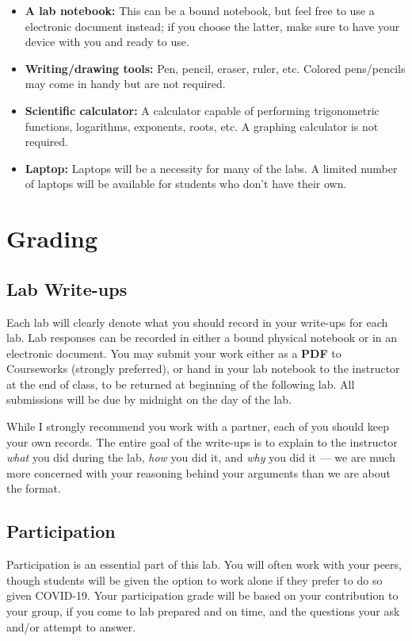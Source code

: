 \documentclass[11pt]{article}
\begin{document}
\begin{itemize}
\item \textbf{A lab notebook:} This can be a bound notebook, but feel free to use a electronic document instead; if you choose the latter, make sure to have your device with you and ready to use.  
\item \textbf{Writing/drawing tools:} Pen, pencil, eraser, ruler, etc. Colored pens/pencils may come in handy but are not required.
\item \textbf{Scientific calculator:}  A calculator capable of performing trigonometric functions, logarithms, exponents, roots, etc. A graphing calculator is not required. 
\item \textbf{Laptop:} Laptops will be a necessity for many of the labs.  A limited number of laptops will be available for students who don't have their own. \\
\end{itemize}

\section*{Grading}

\subsection*{Lab Write-ups}
Each lab will clearly denote what you should record in your write-ups for each lab. Lab responses can be recorded in either a bound physical notebook or in an electronic document. You may submit your work either as a \textbf{PDF} to Courseworks (strongly preferred), or hand in your lab notebook to the instructor at the end of class, to be returned at beginning of the following lab.  All submissions will be due by midnight on the day of the lab.

\noindent While I strongly recommend you work with a partner, each of you should keep your own records. The entire goal of the write-ups is to explain to the instructor \textit{what} you did during the lab, \textit{how} you did it, and \textit{why} you did it --- we are much more concerned with your reasoning behind your arguments than we are about the format.

\subsection*{Participation}
\noindent Participation is an essential part of this lab. You will often work with your peers, though students will be given the option to work alone if they prefer to do so given COVID-19. Your participation grade will be based on your contribution to your group, if you come to lab prepared and on time, and the questions your ask and/or attempt to answer.
\end{document}
